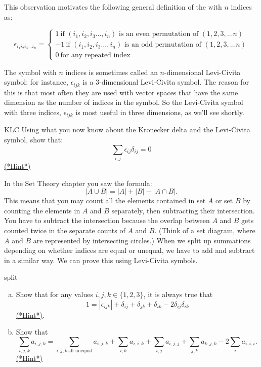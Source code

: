 This observation motivates the following general definition  of the  with $n$ indices as:

\[ \epsilon_{i_1 i_2 i_3 \ldots i_n}=
\begin{cases}
1 ~ \text{if $(i_1,i_2,i_3 \ldots,i_n)$ is an even permutation of $(1,2,3, \ldots n)$}\\
-1 ~ \text{if $(i_1,i_2,i_3 \ldots,i_n)$ is an odd permutation of $(1,2,3, \ldots n)$}\\
0 ~ \text{for any repeated index}
\end{cases} \]

The symbol with $n$ indices is sometimes called an $n$-dimensional Levi-Civita symbol: for instance, $\epsilon_{ijk}$ is a 3-dimensional Levi-Civita symbol.  The reason for this is that most often they are used with vector spaces that have the same dimension as the number of indices in the symbol.  So   the Levi-Civita symbol with three indices, $\epsilon_{ijk}$ is most useful in three dimensions, as we'll see shortly.

\begin{exercise}{KLC}
Using what you now know about the Kronecker delta and the Levi-Civita symbol, show that:
\[
\sum_{i,j} \epsilon_{ij} \delta_{ij}=0
\]
\hyperref[sec:sigma:hints]{(*Hint*)} 
\end{exercise}

In the Set Theory chapter you saw the formula:
\[ |A \cup B| = |A| + |B| - |A \cap B|.\]
This means that you may count all the elements contained in set $A$ or set $B$ by counting the elements in $A$ and $B$ separately, then subtracting their intersection.  You have to  subtract the intersection because  the overlap between $A$ and $B$ gets counted twice in the separate counts of $A$ and $B$.  (Think of a set diagram, where $A$ and $B$ are represented by intersecting circles.)  When we split up summations depending on whether indices are equal or unequal, we have to add and subtract in a similar way. We can prove this using Levi-Civita symbols.
  
\begin{exercise}{split}
\begin{enumerate}[(a)]
\item
Show that for any values $i,j,k \in \{1,2,3\}$, it is always true that 
\[ 1=|\epsilon_{ijk}|+\delta_{ij}+\delta_{jk}+\delta_{ik}-2\delta_{ij}\delta_{ik}\]
 \hyperref[sec:sigma:hints]{(*Hint*)}.   
\item
Show that 
\[
\sum_{i,j,k} a_{i,j,k}=\sum_{i,j,k~\text{all unequal}}a_{i,j,k}+\sum_{i,k}a_{i,i,k}+\sum_{i,j}a_{i,j,j}+\sum_{j,k}a_{k,j,k}-2\sum_{i}a_{i,i,i}.
\]
\hyperref[sec:sigma:hints]{(*Hint*)} 
\end{enumerate}
\end{exercise}


